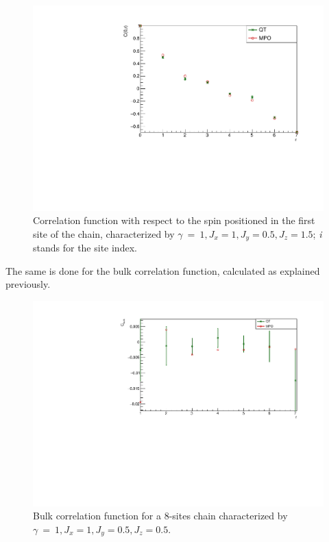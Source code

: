 \begin{figure}[H]
    \centering
    \includegraphics[scale=0.7]{Figures/8sites/CorrFunc1_8s_J10515.pdf}
    \caption{Correlation function with respect to the spin positioned in the first site of the chain, characterized by $\gamma~=~1, J_x=1, J_y=0.5, J_z=1.5$; \emph{i} stands for the site index.}
    \label{fig:my_label}
\end{figure}

The same is done for the bulk correlation function, calculated as explained previously.

\begin{figure}[H]
    \centering
    \includegraphics[scale=0.7]{Figures/8sites/CorrFuncBulkCONN_8sJ10505.pdf}
    \caption{Bulk correlation function for a 8-sites chain characterized by $\gamma~=~1, J_x=1, J_y=0.5, J_z=0.5$.}
    \label{fig:my_label}
\end{figure}

